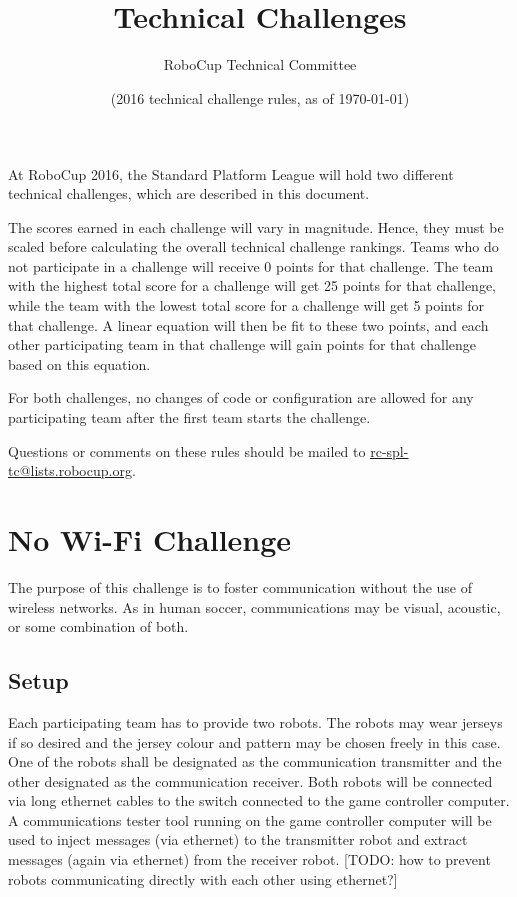 \documentclass[12pt]{article}
\title{\leaguename \\ Technical Challenges}
\author{RoboCup Technical Committee}
\date{(2016 technical challenge rules, as of \today)}
\begin{document}
\maketitle

At RoboCup 2016, the Standard Platform League will hold two different technical challenges, which are described in this document.

The scores earned in each challenge will vary in magnitude.  Hence, they must be scaled before calculating the overall technical challenge rankings.  Teams who do not participate in a challenge will receive 0 points for that challenge.  The team with the highest total score for a challenge will get 25 points for that challenge, while the team with the lowest total score for a challenge will get 5 points for that challenge.  A linear equation will then be fit to these two points, and each other participating team in that challenge will gain points for that challenge based on this equation.

For both challenges, no changes of code or configuration are allowed for any participating team after the first team starts the challenge. 

Questions or comments on these rules should be mailed to {\small \url{rc-spl-tc@lists.robocup.org}}.

\vfill

\renewcommand\contentsname{Challenges}
\tableofcontents
\setcounter{tocdepth}{1}

\thispagestyle{fancy}

\clearpage

\cfoot{\thepage}
\setcounter{page}{1}

\newcommand{\openMinNum}{three}




\section{No Wi-Fi Challenge}

The purpose of this challenge is to foster communication without the use of wireless networks.
As in human soccer, communications may be visual, acoustic, or some combination of both.

\subsection{Setup}
Each participating team has to provide two robots. The robots may wear jerseys if so desired and the
jersey colour and pattern may be chosen freely in this case. One of the robots shall be designated as
the communication transmitter and the other designated as the communication receiver. 
Both robots will be connected via long ethernet cables to the switch connected to the game controller computer.
A communications tester tool running on the game controller computer will be used to inject messages (via
ethernet) to the transmitter robot and extract messages (again via ethernet) from the receiver robot.
[TODO: how to prevent robots communicating directly with each other using ethernet?]
\end{document}
